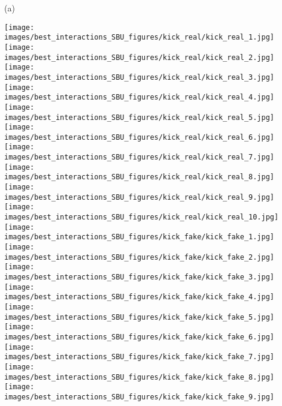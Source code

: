 \documentclass[times,twocolumn,final]{elsarticle}
\begin{document}
\begin{figure*}
\centering
    \begin{minipage}{0.08\textwidth}
    (a)\quad{}%
    \end{minipage}
    \begin{minipage}{0.9\textwidth}
\texttt{[image: images/best\_interactions\_SBU\_figures/kick\_real/kick\_real\_1.jpg]}
  \hfill
  \texttt{[image: images/best\_interactions\_SBU\_figures/kick\_real/kick\_real\_2.jpg]}
  \hfill
  \texttt{[image: images/best\_interactions\_SBU\_figures/kick\_real/kick\_real\_3.jpg]}
  \hfill
  \texttt{[image: images/best\_interactions\_SBU\_figures/kick\_real/kick\_real\_4.jpg]}
  \hfill
  \texttt{[image: images/best\_interactions\_SBU\_figures/kick\_real/kick\_real\_5.jpg]}
  \hfill
  \texttt{[image: images/best\_interactions\_SBU\_figures/kick\_real/kick\_real\_6.jpg]}
  \hfill
  \texttt{[image: images/best\_interactions\_SBU\_figures/kick\_real/kick\_real\_7.jpg]}
  \hfill
  \texttt{[image: images/best\_interactions\_SBU\_figures/kick\_real/kick\_real\_8.jpg]}
  \hfill
  \texttt{[image: images/best\_interactions\_SBU\_figures/kick\_real/kick\_real\_9.jpg]}
  \hfill
  \texttt{[image: images/best\_interactions\_SBU\_figures/kick\_real/kick\_real\_10.jpg]}
  \hfill \\
  \texttt{[image: images/best\_interactions\_SBU\_figures/kick\_fake/kick\_fake\_1.jpg]}
  \hfill
  \texttt{[image: images/best\_interactions\_SBU\_figures/kick\_fake/kick\_fake\_2.jpg]}
  \hfill 
  \texttt{[image: images/best\_interactions\_SBU\_figures/kick\_fake/kick\_fake\_3.jpg]}
  \hfill 
  \texttt{[image: images/best\_interactions\_SBU\_figures/kick\_fake/kick\_fake\_4.jpg]}
  \hfill 
  \texttt{[image: images/best\_interactions\_SBU\_figures/kick\_fake/kick\_fake\_5.jpg]}
  \hfill 
  \texttt{[image: images/best\_interactions\_SBU\_figures/kick\_fake/kick\_fake\_6.jpg]}
  \hfill 
  \texttt{[image: images/best\_interactions\_SBU\_figures/kick\_fake/kick\_fake\_7.jpg]}
  \hfill 
  \texttt{[image: images/best\_interactions\_SBU\_figures/kick\_fake/kick\_fake\_8.jpg]}
  \hfill 
  \texttt{[image: images/best\_interactions\_SBU\_figures/kick\_fake/kick\_fake\_9.jpg]}

\end{minipage}
\end{figure*}
\end{document}
